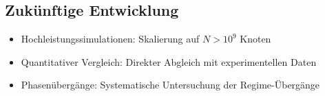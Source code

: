 \subsection{Zukünftige Entwicklung}
\label{sub:numerik_ausblick}

\begin{itemize}
    \item Hochleistungssimulationen: Skalierung auf \( N > 10^9 \) Knoten
    \item Quantitativer Vergleich: Direkter Abgleich mit experimentellen Daten
    \item Phasenübergänge: Systematische Untersuchung der Regime-Übergänge
\end{itemize}